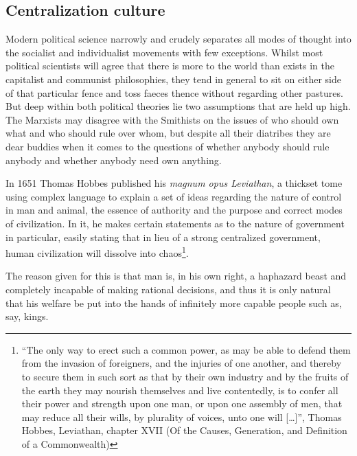 \subsection{Centralization culture}
\label{s:artificial_scarcity:unspoken_mythology:centralization_culture}

Modern political science narrowly and crudely separates all modes of thought
into the socialist and individualist movements with few exceptions. Whilst most
political scientists will agree that there is more to the world than exists in
the capitalist and communist philosophies, they tend in general to sit on 
either side of that particular fence and toss faeces thence without regarding
other pastures. But deep within both political theories lie two assumptions 
that are held up high. The Marxists may disagree with the Smithists on the
issues of who should own what and who should rule over whom, but despite all
their diatribes they are dear buddies when it comes to the questions of whether
anybody should rule anybody and whether anybody need own anything.

In 1651 Thomas Hobbes published his \textit{magnum opus Leviathan}, a thickset
tome using complex language to explain a set of ideas regarding the nature of
control in man and animal, the essence of authority and the purpose and correct
modes of civilization. In it, he makes certain statements as to the nature of
government in particular, easily stating that in lieu of a strong centralized
government, human civilization will dissolve into chaos\footnote{``The only way
to erect such a common power, as may be able to defend them from the invasion 
of foreigners, and the injuries of one another, and thereby to secure them in
such sort as that by their own industry and by the fruits of the earth they may
nourish themselves and live contentedly, is to confer all their power and
strength upon one man, or upon one assembly of men, that may reduce all their
wills, by plurality of voices, unto one will [\ldots]'', Thomas Hobbes,
Leviathan, chapter XVII (Of the Causes, Generation, and Def\hbox{}inition of a
Commonwealth)}.

The reason given for this is that man is, in his own right, a haphazard beast
and completely incapable of making rational decisions, and thus it is only
natural that his welfare be put into the hands of inf\hbox{}initely more 
capable people such as, say, kings.

